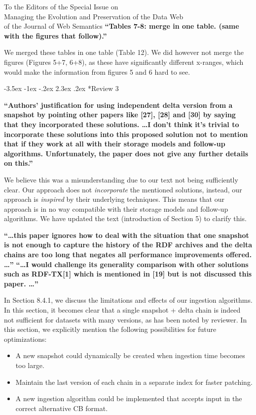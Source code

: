 \documentclass{letter}
\makeatletter
\newcounter{section}
\newcommand\section{\@startsection {section}{1}{\z@}%
                                   {-3.5ex \@plus -1ex \@minus -.2ex}%
                                   {2.3ex \@plus.2ex}%
                                   {\normalfont\Large\bfseries}}
\makeatother
\begin{document}
\begin{letter}{To the Editors of the Special Issue on\\Managing the Evolution and Preservation of the Data Web\\of the Journal of Web Semantics}
\textbf{\enquote{Tables 7-8: merge in one table. (same with the figures that follow).}}

We merged these tables in one table (Table 12).
We did however not merge the figures (Figures 5+7, 6+8), as these have significantly different x-ranges,
which would make the information from figures 5 and 6 hard to see.

\pagebreak
\section*{Review 3}

\textbf{\enquote{Authors' justification for using independent delta version from a snapshot by pointing other papers like [27], [28] and [30] by saying that they incorporated these solutions. \ldots I don't think it's trivial to incorporate these solutions into this proposed solution not to mention that if they work at all with their storage models and follow-up algorithms. Unfortunately, the paper does not give any further details on this.}}

We believe this was a misunderstanding due to our text not being sufficiently clear.
Our approach does not \emph{incorporate} the mentioned solutions,
instead, our approach is \emph{inspired} by their underlying techniques.
This means that our approach is in no way compatible with their storage models and follow-up algorithms.
We have updated the text (introduction of Section 5) to clarify this.

\textbf{\enquote{\ldots this paper ignores how to deal with the situation that one snapshot is not enough to capture the history of the RDF archives and the delta chains are too long that negates all performance improvements offered. \ldots}}
\textbf{\enquote{\ldots I would challenge its generality comparison with other solutions such as RDF-TX[1] which is mentioned in [19] but is not discussed this paper. \ldots}}

In Section 8.4.1, we discuss the limitations and effects of our ingestion algorithms.
In this section, it becomes clear that a single snapshot + delta chain is indeed not sufficient for datasets with many versions,
as has been noted by reviewer.
In this section, we explicitly mention the following possibilities for future optimizations:
\begin{itemize}
    \item A new snapshot could dynamically be created when ingestion time becomes too large.
    \item Maintain the last version of each chain in a separate index for faster patching.
    \item A new ingestion algorithm could be implemented that accepts input in the correct alternative CB format.
\end{itemize}


\end{letter}
\end{document}
